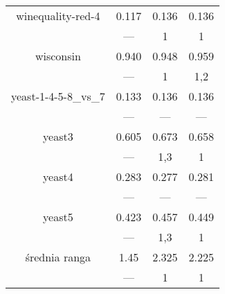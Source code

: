 \documentclass[a4paper,12pt]{article}
\begin{document}
\begin{table}[H]
\begin{center}
\begin{tabular}{|c|c|c|c|}
    winequality-red-4 & 0.117 & 0.136 & 0.136 \\
	& --- & 1 & 1 \\
    \hline
    wisconsin & 0.940 & 0.948 & 0.959 \\
	& --- & 1 & 1,2 \\
    \hline
    yeast-1-4-5-8\_vs\_7 & 0.133 & 0.136 & 0.136 \\
	& --- & --- & --- \\
    \hline
    yeast3 & 0.605 & 0.673 & 0.658 \\
	& --- & 1,3 & 1 \\
    \hline
    yeast4 & 0.283 & 0.277 & 0.281 \\
	& --- & --- & --- \\
    \hline
    yeast5 & 0.423 & 0.457 & 0.449 \\
	& --- & 1,3 & 1 \\
    \hline
    \hline
    średnia ranga & 1.45 & 2.325 & 2.225 \\
    & --- & 1 & 1 \\
    \hline
    \end{tabular}
    \end{center}
\end{table}
\end{document}
